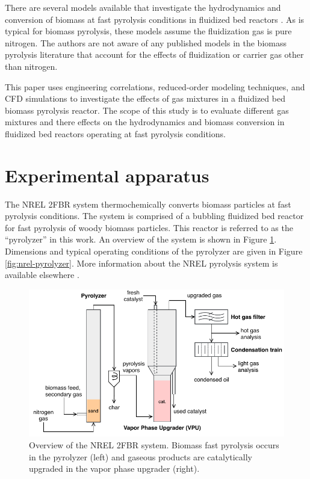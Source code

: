 \documentclass{article}
\begin{document}
There are several models available that investigate the hydrodynamics and conversion of biomass at fast pyrolysis conditions in fluidized bed reactors \cite{Papadikis-2010, Mellin-2014}. As is typical for biomass pyrolysis, these models assume the fluidization gas is pure nitrogen. The authors are not aware of any published models in the biomass pyrolysis literature that account for the effects of fluidization or carrier gas other than nitrogen.

This paper uses engineering correlations, reduced-order modeling techniques, and CFD simulations to investigate the effects of gas mixtures in a fluidized bed biomass pyrolysis reactor. The scope of this study is to evaluate different gas mixtures and there effects on the hydrodynamics and biomass conversion in fluidized bed reactors operating at fast pyrolysis conditions.

\section{Experimental apparatus}

The NREL 2FBR system thermochemically converts biomass particles at fast pyrolysis conditions. The system is comprised of a bubbling fluidized bed reactor for fast pyrolysis of woody biomass particles. This reactor is referred to as the ``pyrolyzer'' in this work. An overview of the system is shown in Figure \ref{fig:nrel-system}. Dimensions and typical operating conditions of the pyrolyzer are given in Figure \ref{fig:nrel-pyrolyzer}. More information about the NREL pyrolysis system is available elsewhere \cite{Howe-2015, Trendewicz-2015}.

\begin{figure}[ht]
    \centering
    \includegraphics[width=\textwidth]{system.pdf}
    \caption{Overview of the NREL 2FBR system. Biomass fast pyrolysis occurs in the pyrolyzer (left) and gaseous products are catalytically upgraded in the vapor phase upgrader (right).}
    \label{fig:nrel-system}
\end{figure}
\end{document}
